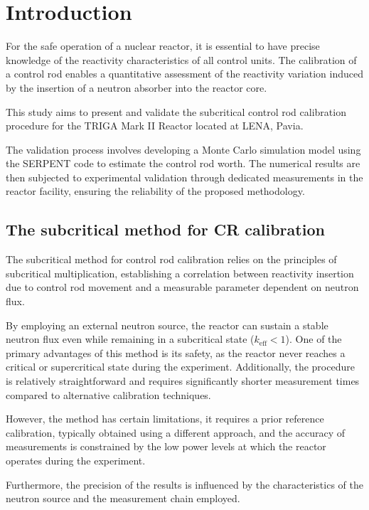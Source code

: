 \sloppy

\section{Introduction}

For the safe operation of a nuclear reactor, it is essential to have precise knowledge of the reactivity characteristics of all control units. The calibration of a control rod enables a quantitative assessment of the reactivity variation induced by the insertion of a neutron absorber into the reactor core.

This study aims to present and validate the subcritical control rod calibration procedure for the TRIGA Mark II Reactor located at LENA, Pavia. 

The validation process involves developing a Monte Carlo simulation model using the SERPENT code to estimate the control rod worth. 
The numerical results are then subjected to experimental validation through dedicated measurements in the reactor facility, ensuring the reliability of the proposed methodology.

\subsection{The subcritical method for CR calibration}
The subcritical method for control rod calibration relies on the principles of subcritical multiplication, establishing a correlation between reactivity insertion due to control rod movement and a measurable parameter dependent on neutron flux.

By employing an external neutron source, the reactor can sustain a stable neutron flux even while remaining in a subcritical state ($k_{\text{eff}} < 1$). One of the primary advantages of this method is its safety, as the reactor never reaches a critical or supercritical state during the experiment. Additionally, the procedure is relatively straightforward and requires significantly shorter measurement times compared to alternative calibration techniques.

However, the method has certain limitations, it requires a prior reference calibration, typically obtained using a different approach, and the accuracy of measurements is constrained by the low power levels at which the reactor operates during the experiment. 

Furthermore, the precision of the results is influenced by the characteristics of the neutron source and the measurement chain employed.

